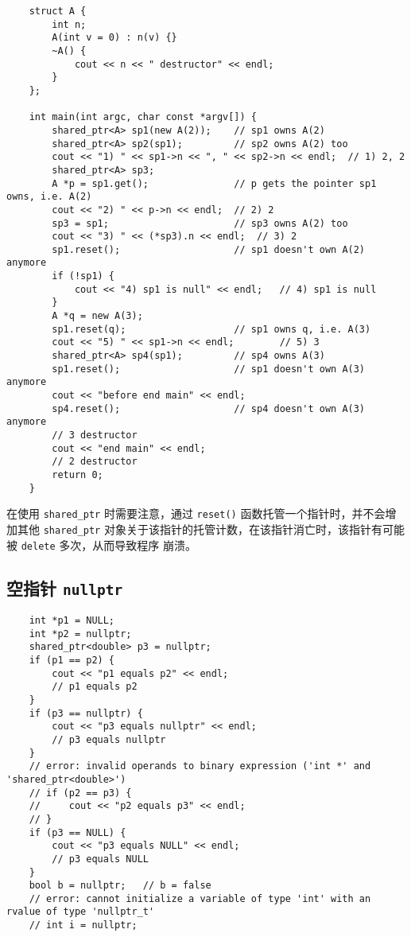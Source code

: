 \documentclass[UTF8]{ctexart}
\begin{document}
\begin{verbatim}
    struct A {
        int n;
        A(int v = 0) : n(v) {}
        ~A() {
            cout << n << " destructor" << endl;
        }
    };

    int main(int argc, char const *argv[]) {
        shared_ptr<A> sp1(new A(2));    // sp1 owns A(2)
        shared_ptr<A> sp2(sp1);         // sp2 owns A(2) too
        cout << "1) " << sp1->n << ", " << sp2->n << endl;  // 1) 2, 2
        shared_ptr<A> sp3;
        A *p = sp1.get();               // p gets the pointer sp1 owns, i.e. A(2)
        cout << "2) " << p->n << endl;  // 2) 2
        sp3 = sp1;                      // sp3 owns A(2) too
        cout << "3) " << (*sp3).n << endl;  // 3) 2
        sp1.reset();                    // sp1 doesn't own A(2) anymore
        if (!sp1) {
            cout << "4) sp1 is null" << endl;   // 4) sp1 is null
        }
        A *q = new A(3);
        sp1.reset(q);                   // sp1 owns q, i.e. A(3)
        cout << "5) " << sp1->n << endl;        // 5) 3
        shared_ptr<A> sp4(sp1);         // sp4 owns A(3)
        sp1.reset();                    // sp1 doesn't own A(3) anymore
        cout << "before end main" << endl;
        sp4.reset();                    // sp4 doesn't own A(3) anymore
        // 3 destructor
        cout << "end main" << endl;
        // 2 destructor
        return 0;
    }
\end{verbatim}

在使用 \texttt{shared\_ptr} 时需要注意，通过 \texttt{reset()} 函数托管一个指针时，并不会增加其他
\texttt{shared\_ptr} 对象关于该指针的托管计数，在该指针消亡时，该指针有可能被 \texttt{delete} 多次，从而导致程序
崩溃。

\subsection{空指针 \texttt{nullptr}}
\begin{verbatim}
    int *p1 = NULL;
    int *p2 = nullptr;
    shared_ptr<double> p3 = nullptr;
    if (p1 == p2) {
        cout << "p1 equals p2" << endl;
        // p1 equals p2
    }
    if (p3 == nullptr) {
        cout << "p3 equals nullptr" << endl;
        // p3 equals nullptr
    }
    // error: invalid operands to binary expression ('int *' and 'shared_ptr<double>')
    // if (p2 == p3) {
    //     cout << "p2 equals p3" << endl;
    // }
    if (p3 == NULL) {
        cout << "p3 equals NULL" << endl;
        // p3 equals NULL
    }
    bool b = nullptr;   // b = false
    // error: cannot initialize a variable of type 'int' with an rvalue of type 'nullptr_t'
    // int i = nullptr;
\end{verbatim}
\end{document}
